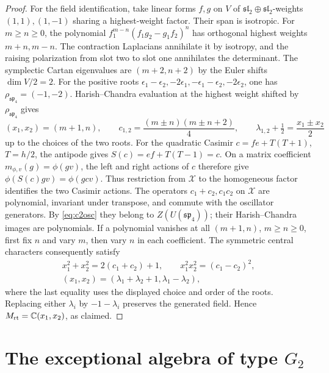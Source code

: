 \documentclass[11pt,a4paper]{article}
\newcommand{\C}{\mathbb C}
\theoremstyle{definition}
\begin{document}
\begin{proof}
For the field identification, take linear forms \(f,g\) on \(V\) of \(\mathfrak{sl}_2\oplus\mathfrak{sl}_2\)-weights \((1,1),(1,-1)\) sharing a highest-weight factor. Their span is isotropic. For \(m\ge n\ge0\), the polynomial \(f_1^{m-n}(f_1g_2-g_1f_2)^n\) has orthogonal highest weights \(m+n,m-n\). The contraction Laplacians annihilate it by isotropy, and the raising polarization from slot two to slot one annihilates the determinant. The symplectic Cartan eigenvalues are \((m+2,n+2)\) by the Euler shifts \(\dim V/2=2\). For the positive roots \(\epsilon_1-\epsilon_2,-2\epsilon_1,-\epsilon_1-\epsilon_2,-2\epsilon_2\), one has \(\rho_{\mathfrak{sp}_4}=(-1,-2)\). Harish--Chandra evaluation at the highest weight shifted by \(\rho_{\mathfrak{sp}_4}\) \cite[Part~III, Lemma~36 and Thm.~5]{HC} gives
\[
 (x_1,x_2)=(m+1,n),\qquad
 c_{1,2}=\frac{(m\pm n)(m\pm n+2)}4,\qquad
 \lambda_{1,2}+\tfrac12=\frac{x_1\pm x_2}{2}
\]
up to the choices of the two roots. For the quadratic Casimir \(c=fe+T(T+1)\), \(T=h/2\), the antipode gives \(S(c)=ef+T(T-1)=c\). On a matrix coefficient \(m_{\phi,v}(g)=\phi(gv)\), the left and right actions of \(c\) therefore give \(\phi(S(c)gv)=\phi(gc v)\). Thus restriction from \(\mathcal X\) to the homogeneous factor identifies the two Casimir actions. The operators \(c_1+c_2,c_1c_2\) on \(\mathcal X\) are polynomial, invariant under transpose, and commute with the oscillator generators. By \eqref{eq:c2osc} they belong to \(Z(U(\mathfrak{sp}_4))\); their Harish--Chandra images are polynomials. If a polynomial vanishes at all \((m+1,n)\), \(m\ge n\ge0\), first fix \(n\) and vary \(m\), then vary \(n\) in each coefficient. The symmetric central characters consequently satisfy
\[
 \begin{gathered}
 x_1^2+x_2^2=2(c_1+c_2)+1,\qquad x_1^2x_2^2=(c_1-c_2)^2,\\
 (x_1,x_2)=(\lambda_1+\lambda_2+1,\lambda_1-\lambda_2),
 \end{gathered}
\]
where the last equality uses the displayed choice and order of the roots. Replacing either \(\lambda_i\) by \(-1-\lambda_i\) preserves the generated field. Hence \(M_{\rm rt}=\C(x_1,x_2)\), as claimed.
\end{proof}

\section{\texorpdfstring{The exceptional algebra of type \(G_2\)}{The exceptional algebra of type G2}}
\label{sec:g2radial}
\end{document}

